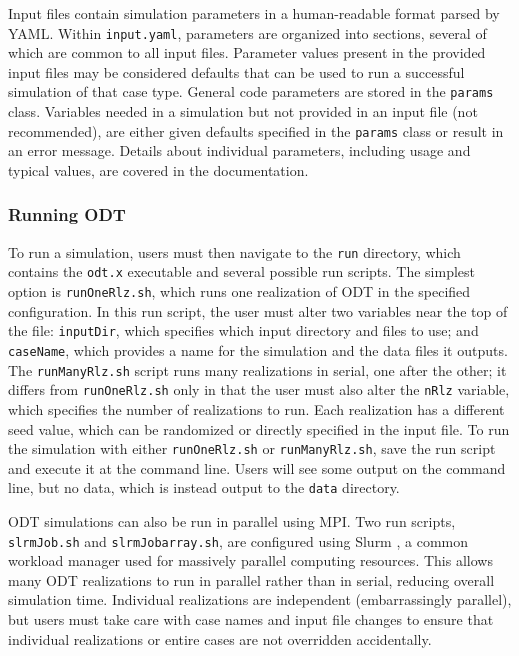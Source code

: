 \documentclass[preprint,12pt, a4paper]{elsarticle}
\begin{document}
Input files contain simulation parameters in a human-readable format parsed by YAML. Within \texttt{input.yaml}, parameters are organized into sections, several of which are common to all input files. Parameter values present in the provided input files may be considered defaults that can be used to run a successful simulation of that case type. General code parameters are stored in the \texttt{params} class. Variables needed in a simulation but not provided in an input file (not recommended), are either given defaults specified in the \texttt{params} class or result in an error message. Details about individual parameters, including usage and typical values, are covered in the documentation.

\subsubsection{Running ODT}

To run a simulation, users must then navigate to the \texttt{run} directory, which contains the \texttt{odt.x} executable and several possible run scripts. The simplest option is \texttt{runOneRlz.sh}, which runs one realization of ODT in the specified configuration. In this run script, the user must alter two variables near the top of the file: \texttt{inputDir}, which specifies which input directory and files to use; and \texttt{caseName}, which provides a name for the simulation and the data files it outputs. The \texttt{runManyRlz.sh} script runs many realizations in serial, one after the other; it differs from \texttt{runOneRlz.sh} only in that the user must also alter the \texttt{nRlz} variable, which specifies the number of realizations to run. Each realization has a different seed value, which can be randomized or directly specified in the input file. To run the simulation with either \texttt{runOneRlz.sh} or \texttt{runManyRlz.sh}, save the run script and execute it at the command line. Users will see some output on the command line, but no data, which is instead output to the \texttt{data} directory.  

ODT simulations can also be run in parallel using MPI. Two run scripts, \texttt{slrmJob.sh} and \texttt{slrmJob\textunderscore array.sh}, are configured using Slurm \cite{Yoo_2003}, a common workload manager used for massively parallel computing resources. This allows many ODT realizations to run in parallel rather than in serial, reducing overall simulation time. Individual realizations are independent (embarrassingly parallel), but users must take care with case names and input file changes to ensure that individual realizations or entire cases are not overridden accidentally. 
\end{document}
